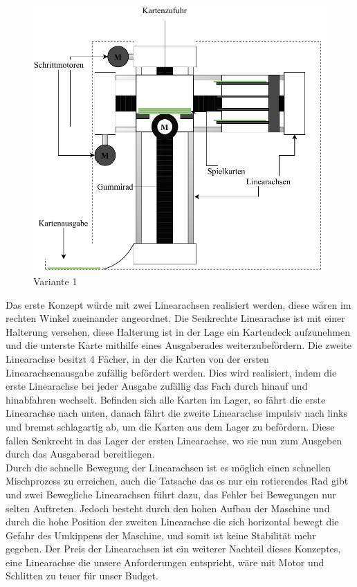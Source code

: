 \begin{figure}[hb]
    \centering
    \includegraphics[scale=0.9,page=1]{fig/mech/Version1}
    \caption{Variante 1}
\end{figure}


Das erste Konzept würde mit zwei Linearachsen realisiert werden, diese wären im rechten Winkel zueinander
angeordnet. Die Senkrechte Linearachse ist mit einer Halterung versehen, diese Halterung ist in der Lage
ein Kartendeck aufzunehmen und die unterste Karte mithilfe eines Ausgaberades weiterzubefördern. Die zweite
Linearachse besitzt 4 Fächer, in der die Karten von der ersten Linearachsenausgabe zufällig befördert werden.
Dies wird realisiert, indem die erste Linearachse bei jeder Ausgabe zufällig das Fach durch hinauf und
hinabfahren wechselt. Befinden sich alle Karten im Lager, so fährt die erste Linearachse nach unten, danach
fährt die zweite Linearachse impulsiv nach links und bremst schlagartig ab, um die Karten aus dem Lager zu befördern. Diese fallen
Senkrecht in das Lager der ersten Linearachse, wo sie nun zum Ausgeben durch das Ausgaberad bereitliegen. \\



Durch die schnelle Bewegung der Linearachsen ist es möglich einen schnellen Mischprozess zu erreichen,
auch die Tatsache das es nur ein rotierendes Rad gibt und zwei Bewegliche Linearachsen führt dazu, das
Fehler bei Bewegungen nur selten Auftreten. Jedoch besteht durch den hohen Aufbau der Maschine und durch die hohe
Position der zweiten Linearachse die sich horizontal bewegt die Gefahr des Umkippens der Maschine, und somit ist
keine Stabilität mehr gegeben. Der Preis der Linearachsen ist ein weiterer Nachteil dieses Konzeptes, eine Linearachse
die unsere Anforderungen entspricht, wäre mit Motor und Schlitten zu teuer für unser Budget. \\

